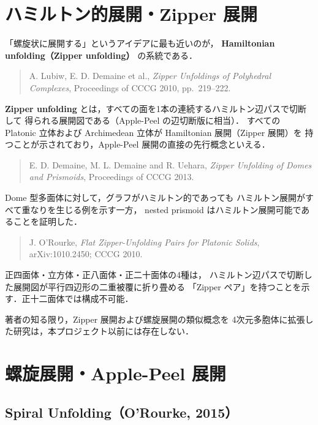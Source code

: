 \documentclass[a4paper,11pt]{article}
\begin{document}
\section{ハミルトン的展開・Zipper 展開}

「螺旋状に展開する」というアイデアに最も近いのが，
\textbf{Hamiltonian unfolding（Zipper unfolding）} の系統である．

\begin{quotation}\noindent
  A. Lubiw, E. D. Demaine et al.,
  \textit{Zipper Unfoldings of Polyhedral Complexes},
  Proceedings of CCCG 2010, pp.~219--222.
\end{quotation}

\textbf{Zipper unfolding} とは，すべての面を1本の連続するハミルトン辺パスで切断して
得られる展開図である（Apple-Peel の辺切断版に相当）．
すべての Platonic 立体および Archimedean 立体が Hamiltonian 展開（Zipper 展開）を
持つことが示されており，Apple-Peel 展開の直接の先行概念といえる．

\begin{quotation}\noindent
  E. D. Demaine, M. L. Demaine and R. Uehara,
  \textit{Zipper Unfolding of Domes and Prismoids},
  Proceedings of CCCG 2013.
\end{quotation}

Dome 型多面体に対して，グラフがハミルトン的であっても
ハミルトン展開がすべて重なりを生じる例を示す一方，
nested prismoid はハミルトン展開可能であることを証明した．

\begin{quotation}\noindent
  J. O'Rourke,
  \textit{Flat Zipper-Unfolding Pairs for Platonic Solids},
  arXiv:1010.2450; CCCG 2010.
\end{quotation}

正四面体・立方体・正八面体・正二十面体の4種は，
ハミルトン辺パスで切断した展開図が平行四辺形の二重被覆に折り畳める
「Zipper ペア」を持つことを示す．正十二面体では構成不可能．

\bigskip\noindent
著者の知る限り，Zipper 展開および螺旋展開の類似概念を
4次元多胞体に拡張した研究は，本プロジェクト以前には存在しない．

\section{螺旋展開・Apple-Peel 展開}

\subsection{Spiral Unfolding（O'Rourke, 2015）}
\end{document}

